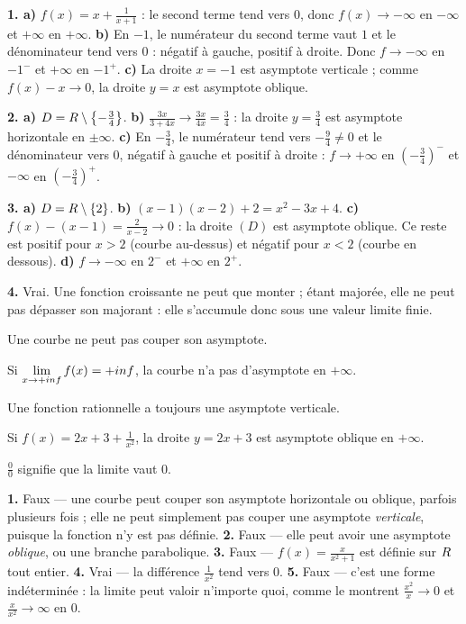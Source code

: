\begin{corrige}[annales]
\textbf{1. a)} $f(x) = x+\frac{1}{x+1}$ : le second terme tend vers $0$,
donc $f(x) \to -\infty$ en $-\infty$ et $+\infty$ en $+\infty$.
\textbf{b)} En $-1$, le numérateur du second terme vaut $1$ et le
dénominateur tend vers $0$ : négatif à gauche, positif à droite. Donc
$f \to -\infty$ en $-1^{-}$ et $+\infty$ en $-1^{+}$.
\textbf{c)} La droite $x = -1$ est asymptote verticale ; comme
$f(x)-x \to 0$, la droite $y = x$ est asymptote oblique.

\textbf{2. a)} $D = R\setminus\left\{-\frac34\right\}$.
\textbf{b)} $\frac{3x}{3+4x} \to \frac{3x}{4x} = \frac34$ : la droite
$y = \frac34$ est asymptote horizontale en $\pm\infty$.
\textbf{c)} En $-\frac34$, le numérateur tend vers $-\frac94 \neq 0$ et le
dénominateur vers $0$, négatif à gauche et positif à droite :
$f \to +\infty$ en $\left(-\frac34\right)^{-}$ et $-\infty$ en
$\left(-\frac34\right)^{+}$.

\textbf{3. a)} $D = R\setminus\{2\}$.
\textbf{b)} $(x-1)(x-2)+2 = x^{2}-3x+4$. \checkmark
\textbf{c)} $f(x)-(x-1) = \frac{2}{x-2} \to 0$ : la droite $(D)$ est
asymptote oblique. Ce reste est positif pour $x>2$ (courbe au-dessus) et
négatif pour $x<2$ (courbe en dessous).
\textbf{d)} $f \to -\infty$ en $2^{-}$ et $+\infty$ en $2^{+}$.

\textbf{4.} Vrai. Une fonction croissante ne peut que monter ; étant
majorée, elle ne peut pas dépasser son majorant : elle s'accumule donc sous
une valeur limite finie.
\end{corrige}

\begin{vraifaux}
\exo Une courbe ne peut pas couper son asymptote.

\exo Si $\limpinf f(x) = +\infty$, la courbe n'a pas d'asymptote en
$+\infty$.

\exo Une fonction rationnelle a toujours une asymptote verticale.

\exo Si $f(x) = 2x+3+\frac{1}{x^{2}}$, la droite $y = 2x+3$ est asymptote
oblique en $+\infty$.

\exo $\frac{0}{0}$ signifie que la limite vaut $0$.
\end{vraifaux}

\begin{corrige}
\textbf{1.} Faux — une courbe peut couper son asymptote horizontale ou
oblique, parfois plusieurs fois ; elle ne peut simplement pas couper une
asymptote \emph{verticale}, puisque la fonction n'y est pas définie.
\textbf{2.} Faux — elle peut avoir une asymptote \emph{oblique}, ou une
branche parabolique.
\textbf{3.} Faux — $f(x) = \frac{x}{x^{2}+1}$ est définie sur $R$ tout
entier.
\textbf{4.} Vrai — la différence $\frac{1}{x^{2}}$ tend vers $0$.
\textbf{5.} Faux — c'est une forme indéterminée : la limite peut valoir
n'importe quoi, comme le montrent $\frac{x^{2}}{x} \to 0$ et
$\frac{x}{x^{2}} \to \infty$ en $0$.
\end{corrige}

